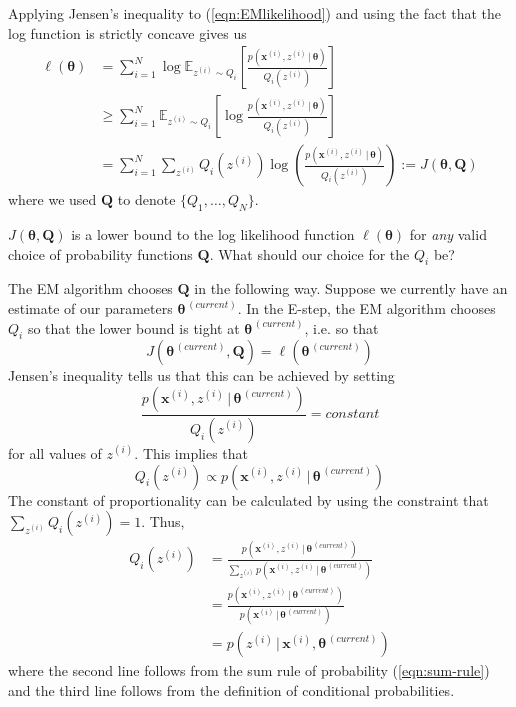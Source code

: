 \documentclass[final,3p,times,twocolumn]{elsarticle}
\let\bs\boldsymbol
\begin{document}
Applying Jensen's inequality to (\ref{eqn:EMlikelihood}) and using the fact that the log function is strictly concave gives us
\begin{equation*}
\begin{split}
\ell(\bs\theta) &=  \sum_{i=1}^N \log \mathbb{E}_{z^{(i)} \sim Q_i}\left[\frac{p(\bs x^{(i)},z^{(i)}\,|\,\bs\theta)}{Q_i(z^{(i)})}\right]\\
&\geq \sum_{i=1}^N \mathbb{E}_{z^{(i)} \sim Q_i}\left[\log \frac{p(\bs x^{(i)},z^{(i)}\,|\,\bs\theta)}{Q_i(z^{(i)})}\right]\\ 
&= \sum_{i=1}^N \sum_{z^{(i)}} Q_i(z^{(i)}) \log \left(\frac{p(\bs x^{(i)},z^{(i)}\,|\,\bs\theta)}{Q_i(z^{(i)})}\right) := J(\bs\theta,\bs Q)
\end{split}
\end{equation*}
where we used $\bs Q$ to denote $\{Q_1,\dots,Q_N\}$.

$J(\bs\theta,\bs Q)$ is a lower bound to the log likelihood function $\ell(\bs\theta)$ for \emph{any} valid choice of probability functions $\bs Q$.
What should our choice for the $Q_i$ be?


The EM algorithm chooses $\bs Q$ in the following way.
Suppose we currently have an estimate of our parameters $\bs\theta^{\,(current)}$. 
In the E-step, the EM algorithm chooses $Q_i$ so that the lower bound is tight at $\bs\theta^{\,(current)}$, i.e. so that
\begin{equation*}
J\left(\bs\theta^{\,(current)},\bs Q\right) = \ell\left(\bs\theta^{\,(current)}\right)
\end{equation*}
Jensen's inequality tells us that this can be achieved by setting 
\begin{equation*}
\frac{p(\bs x^{(i)},z^{(i)}\,|\,\bs \theta^{\,(current)})}{Q_i(z^{(i)})} = constant
\end{equation*}
for all values of $z^{(i)}$.
This implies that
\begin{equation*}
Q_i(z^{(i)}) \propto p(\bs x^{(i)},z^{(i)}\,|\,\bs\theta^{\,(current)})
\end{equation*}
The constant of proportionality can be calculated by using the constraint that $\sum_{z^{(i)}} Q_i(z^{(i)}) = 1$.
Thus,
\begin{equation}
\label{eqn:EM-E}
\begin{split}
Q_i(z^{(i)}) &= \frac{p(\bs x^{(i)},z^{(i)}\,|\,\bs\theta^{\,(current)})}{\sum_{z^{(i)}}p(\bs x^{(i)},z^{(i)}\,|\,\bs\theta^{\,(current)})}\\
&= \frac{p(\bs x^{(i)},z^{(i)}\,|\,\bs\theta^{\,(current)})}{p(\bs x^{(i)}\,|\,\bs\theta^{\,(current)})}\\
&= p(z^{(i)}\,|\,\bs x^{(i)},\bs\theta^{\,(current)})
\end{split}
\end{equation}
where the second line follows from the sum rule of probability (\ref{eqn:sum-rule}) and the third line follows from the definition of conditional probabilities.
\end{document}
